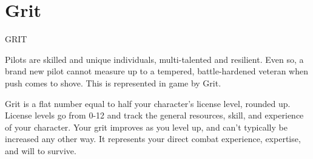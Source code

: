 \section{Grit}
                                                      GRIT

Pilots are skilled and unique individuals, multi-talented and resilient. Even so, a brand new pilot
cannot measure up to a tempered, battle-hardened veteran when push comes to shove. This is
represented in game by Grit.

Grit is a flat number equal to half your character’s license level, rounded up. License levels go
from 0-12 and track the general resources, skill, and experience of your character. Your grit
improves as you level up, and can’t typically be increased any other way. It represents your direct
combat experience, expertise, and will to survive.